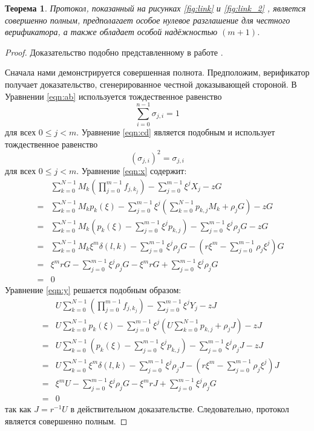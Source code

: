 \documentclass{article}
\newcommand{\sumi}{\sum_{i=0}^{n-1}}
\newcommand{\sumj}{\sum_{j=0}^{m-1}}
\newcommand{\sumk}{\sum_{k=0}^{N-1}}
\newtheorem{theorem}{Теорема}
\theoremstyle{definition}
\begin{document}
\begin{theorem}
Протокол, показанный на рисунках \ref{fig:link} и \ref{fig:link_2} , является совершенно полным, предполагает особое нулевое разглашение для честного верификатора, а также обладает особой надёжностью $(m+1)$.
\end{theorem}

\begin{proof}
Доказательство подобно представленному в работе \cite{bootle}.

Сначала нами демонстрируется совершенная полнота.
Предположим, верификатор получает доказательство, сгенерированное честной доказывающей стороной.
В Уравнении \ref{eqn:ab} используется тождественное равенство $$\sumi \sigma_{j,i} = 1$$ для всех $0 \leq j < m$.
Уравнение \ref{eqn:cd} является подобным и использует тождественное равенство $$\left(\sigma_{j,i}\right)^2 = \sigma_{j,i}$$ для всех $0 \leq j < m$.
Уравнение \ref{eqn:x} содержит:
\begin{eqnarray*}
&& \sumk M_k \left( \prod_{j=0}^{m-1} f_{j,k_j} \right) - \sumj \xi^jX_j - zG \\
&=& \sumk M_k p_k(\xi) - \sumj \xi^j \left( \sumk p_{k,j}M_k + \rho_jG \right) - zG \\
&=& \sumk M_k \left( p_k(\xi) - \sumj \xi^j p_{k,j} \right) - \sumj \xi^j \rho_jG - zG \\
&=& \sumk M_k \xi^m \delta(l,k) - \sumj \xi^j \rho_jG - \left( r\xi^m - \sumj \rho_j\xi^j \right)G \\
&=& \xi^mrG - \sumj \xi^j \rho_jG - \xi^mrG + \sumj \xi^j \rho_jG \\
&=& 0
\end{eqnarray*}
Уравнение \ref{eqn:y} решается подобным образом:
\begin{eqnarray*}
&& U \sumk \left( \prod_{j=0}^{m-1} f_{j,k_j} \right) - \sumj \xi^jY_j - zJ \\
&=& U \sumk p_k(\xi) - \sumj \xi^j \left( U \sumk p_{k,j} + \rho_jJ \right) - zJ \\
&=& U \sumk \left( p_k(\xi) - \sumj \xi^j p_{k,j} \right) - \sumj \xi^j \rho_jJ - zJ \\
&=& U \sumk \xi^m \delta(l,k) - \sumj \xi^j \rho_jJ - \left( r\xi^m - \sumj \rho_j\xi^j \right)J \\
&=& \xi^mU - \sumj \xi^j \rho_jG - \xi^mrJ + \sumj \xi^j \rho_jG \\
&=& 0
\end{eqnarray*}
так как $J = r^{-1}U$ в действительном доказательстве.
Следовательно, протокол является совершенно полным.


\end{proof}
\end{document}
